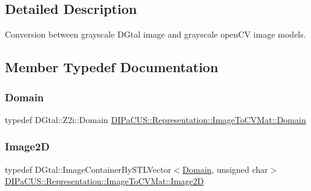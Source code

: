 \subsection{Detailed Description}
Conversion between grayscale D\+Gtal image and grayscale open\+CV image models. 



\subsection{Member Typedef Documentation}
\mbox{\label{structDIPaCUS_1_1Representation_1_1ImageToCVMat_ab2ddd8fb775a4962089398b3fbbea75c}} 
\subsubsection{\texorpdfstring{Domain}{Domain}}
{\footnotesize\ttfamily typedef D\+Gtal\+::\+Z2i\+::\+Domain \mbox{\hyperlink{structDIPaCUS_1_1Representation_1_1ImageToCVMat_ab2ddd8fb775a4962089398b3fbbea75c}{D\+I\+Pa\+C\+U\+S\+::\+Representation\+::\+Image\+To\+C\+V\+Mat\+::\+Domain}}}

\mbox{\label{structDIPaCUS_1_1Representation_1_1ImageToCVMat_acca980e3cfd7e8980cf058d1e8cfb169}} 
\subsubsection{\texorpdfstring{Image2D}{Image2D}}
{\footnotesize\ttfamily typedef D\+Gtal\+::\+Image\+Container\+By\+S\+T\+L\+Vector$<$\mbox{\hyperlink{structDIPaCUS_1_1Representation_1_1ImageToCVMat_ab2ddd8fb775a4962089398b3fbbea75c}{Domain}}, unsigned char$>$ \mbox{\hyperlink{structDIPaCUS_1_1Representation_1_1ImageToCVMat_acca980e3cfd7e8980cf058d1e8cfb169}{D\+I\+Pa\+C\+U\+S\+::\+Representation\+::\+Image\+To\+C\+V\+Mat\+::\+Image2D}}}

